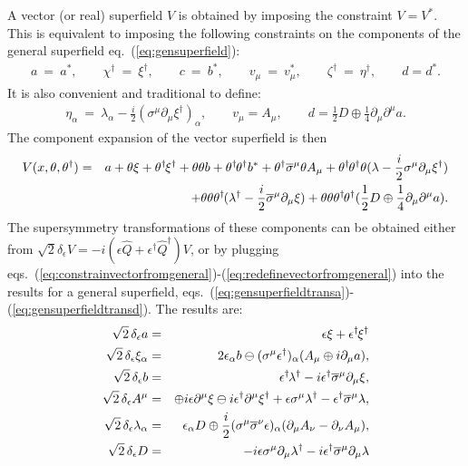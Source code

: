 \documentclass[11pt]{article}
\def\BDneg{-}
\def\BDplus{+}
\def\BDminus{-}
\def\thetasigmamuthetadagger{\theta\sigma^\mu\theta^\dagger}
\def\BDneg{}
\def\BDplus{-}
\def\BDminus{+}
\def\thetasigmamuthetadagger{\theta^\dagger\sigmabar^\mu\theta}
\def\BDneg{\ominus}
\def\BDplus{\oplus}
\def\BDminus{\ominus}
\def\thetasigmamuthetadagger{\theta\sigma^\mu\theta^\dagger}
\def\BDneg{\oplus}
\def\BDplus{\ominus}
\def\BDminus{\oplus}
\def\thetasigmamuthetadagger{\theta^\dagger\sigmabar^\mu\theta}
\newcommand{\thdthd}{\theta^\dagger\hspace{-1pt}\theta^\dagger}
\def\beq{\begin{eqnarray}}
\def\eeq{\end{eqnarray}}
\def\sigmabar{\overline\sigma}
\begin{document}
A vector (or real) superfield $V$ is obtained by
imposing the constraint $V = V^*$. 
This is equivalent to imposing the following constraints 
on the components of the
general superfield eq.~(\ref{eq:gensuperfield}):
\beq
a \> = \> a^*,
\qquad
\chi^\dagger \>=\> \xi^\dagger,
\qquad
c \> = \> b^*,
\qquad
v_\mu \>=\> v_\mu^*,
\qquad
\zeta^\dagger \>=\> \eta^\dagger,
\qquad
d = d^*.
\label{eq:constrainvectorfromgeneral}
\eeq
It is also convenient and traditional to define:
\beq
\eta_\alpha \>=\> \lambda_\alpha - \frac{i}{2} (\sigma^\mu \partial_\mu \xi^\dagger)_\alpha ,
\qquad
v_\mu = A_\mu,
\qquad
d = \frac{1}{2} D \BDminus \frac{1}{4} \partial_\mu \partial^\mu a.
\label{eq:redefinevectorfromgeneral}
\eeq
The component expansion of the vector superfield is then
\beq
V(x,\theta,\theta^\dagger) &=& 
a
+ \theta \xi 
+ \theta^\dagger\hspace{-1pt} \xi^\dagger 
+ \theta\theta b 
+ \thdthd b^* 
+ \thetasigmamuthetadagger  A_\mu 
+ \thdthd \theta 
  (\lambda - \frac{i}{2} \sigma^\mu \partial_\mu \xi^\dagger) 
\nonumber
\\
&&
+ \theta \theta  \theta^\dagger\hspace{-1pt} 
  (\lambda^\dagger - \frac{i}{2} \sigmabar^\mu \partial_\mu \xi)   
+ \theta\theta\thdthd 
  ( \frac{1}{2} D \BDminus \frac{1}{4} \partial_\mu \partial^\mu a).
\label{eq:vectorsuperfieldexpansion}
\eeq
The supersymmetry transformations of these components can be obtained either from
$\sqrt{2} \delta_\epsilon V = -i(\epsilon \hat Q + \epsilon^\dagger \hat Q^\dagger) V$,
or by plugging 
eqs.~(\ref{eq:constrainvectorfromgeneral})-(\ref{eq:redefinevectorfromgeneral}) 
into the results for
a general superfield,
eqs.~(\ref{eq:gensuperfieldtransa})-(\ref{eq:gensuperfieldtransd}).
The results are:
\beq
\sqrt{2}\,
\delta_\epsilon a &=& \epsilon \xi + \epsilon^\dagger\hspace{-1pt}\xi^\dagger
\\
\sqrt{2}\,
\delta_\epsilon \xi_{\alpha} &=& 2 \epsilon_\alpha b
\BDplus (\sigma^\mu \epsilon^\dagger)_\alpha (A_\mu \BDminus i \partial_\mu a)
,
\\
\sqrt{2}\,
\delta_\epsilon b &=& \epsilon^\dagger\hspace{-1pt} \lambda^\dagger 
- i \epsilon^\dagger \sigmabar^\mu \partial_\mu \xi
,
\\
\sqrt{2}\,
\delta_\epsilon A^\mu &=& 
\BDneg i \epsilon \partial^\mu \xi 
\BDplus i \epsilon^\dagger \partial^\mu \xi^\dagger
+ \epsilon \sigma^\mu \lambda^\dagger 
- \epsilon^\dagger \sigmabar^\mu \lambda ,
\\
\sqrt{2}\,
\delta_\epsilon \lambda_\alpha &=&
\epsilon_\alpha D \BDminus \frac{i}{2} (\sigma^\mu \sigmabar^\nu \epsilon)_\alpha
(\partial_\mu A_\nu - \partial_\nu A_\mu)
,
\\
\sqrt{2}\,
\delta_\epsilon D &=&
- i \epsilon \sigma^\mu \partial_\mu \lambda^\dagger
- i \epsilon^\dagger \sigmabar^\mu \partial_\mu \lambda
\label{eq:sqrttwodeltaD}
\eeq
\end{document}
